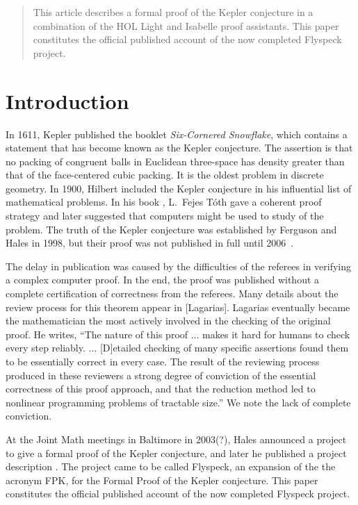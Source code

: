 \begin{abstract}
This article describes a formal proof of the Kepler conjecture in a combination of the HOL Light and Isabelle proof
assistants.
This paper constitutes the official published account of the now completed Flyspeck project.
\end{abstract}


\section{Introduction}


In 1611, Kepler published the booklet {\it Six-Cornered Snowflake}, which contains a statement that has
become  known as the Kepler conjecture.  The assertion is that no packing of congruent balls in Euclidean three-space has
density greater than that of the face-centered cubic packing.  It is the oldest problem in discrete geometry.
In 1900, Hilbert included the Kepler conjecture in his influential list of mathematical problems.  In his book \cite{XX},
L.\ Fejes T\'oth 
gave a coherent proof strategy and later suggested that computers might be used to study of the problem.
The truth of the Kepler conjecture was established 
by Ferguson and Hales in 1998, but their proof was not published in full until 2006~\cite{DCG}.

The delay in publication was caused by the difficulties of the referees in  verifying a complex computer proof.
In the end, the proof was published without a complete certification of correctness from the referees.  Many details about the
review process for this theorem appear in [Lagarias].  Lagarias eventually became the mathematician the most actively
involved in the checking of the original proof.  He  writes, ``The nature of this proof $\ldots$ makes it hard for
humans to check every step reliably. $\ldots$  [D]etailed checking of many specific assertions found them
to be essentially correct in every case.  The result of the reviewing process produced in these reviewers a 
strong degree of conviction of the essential correctness of this proof approach, and that the reduction method
led to nonlinear programming problems of tractable size.''   We note the lack of complete conviction.

At the Joint Math meetings in Baltimore in
2003(?), Hales announced
a project to give a formal proof of the Kepler conjecture,
and later he published a project description \cite{MAPS XX}.
The project came to be called Flyspeck, an expansion of the the acronym FPK, for the Formal Proof of the Kepler conjecture.
This paper constitutes the official published account of the now completed Flyspeck project.


